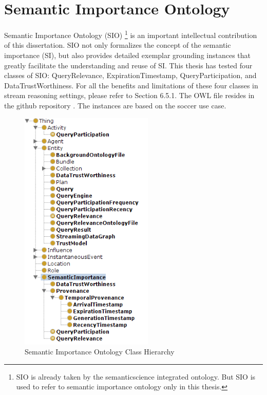  
\appendix    %

\chapter{Semantic Importance Ontology}
Semantic Importance Ontology (SIO) \footnote{SIO is already taken by the semanticscience integrated ontology. But SIO is used to refer to semantic importance ontology only in this thesis.} is an important intellectual contribution of this dissertation. 
SIO not only formalizes the concept of the semantic importance (SI), but also provides detailed exemplar grounding instances that greatly facilitate the understanding and reuse of SI. 
This thesis has tested four classes of SIO: QueryRelevance, ExpirationTimestamp, QueryParticipation, and DataTrustWorthiness.
For all the benefits and limitations of these four classes in stream reasoning settings, please refer to Section 6.5.1.
The OWL file resides in the github repository \cite{ruisio2018}.
The instances are based on the soccer use case.

\begin{figure}[!htbp]
    \centering
    \includegraphics[width=2.5in]{img/app-sio.png}
    \caption{Semantic Importance Ontology Class Hierarchy}
    \label{fig:app-sio}
\end{figure}

